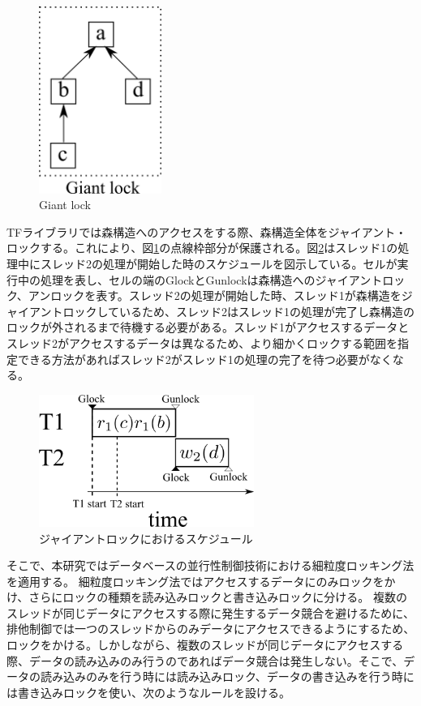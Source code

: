 \documentclass[a4paper]{jreport}	%
\begin{document}
\begin{figure}[h] 
\centering
\includegraphics[width=4cm]{gaint-lock}	
\caption{Giant lock}
\label{fig:giant-lock}
\end{figure}


TFライブラリでは森構造へのアクセスをする際、森構造全体をジャイアント・ロックする。これにより、図\ref{fig:giant-lock}の点線枠部分が保護される。図\ref{fig:g-lock-time}はスレッド1の処理中にスレッド2の処理が開始した時のスケジュールを図示している。セルが実行中の処理を表し、セルの端のGlockとGunlockは森構造へのジャイアントロック、アンロックを表す。スレッド2の処理が開始した時、スレッド1が森構造をジャイアントロックしているため、スレッド2はスレッド1の処理が完了し森構造のロックが外されるまで待機する必要がある。スレッド1がアクセスするデータとスレッド2がアクセスするデータは異なるため、より細かくロックする範囲を指定できる方法があればスレッド2がスレッド1の処理の完了を待つ必要がなくなる。


\begin{figure}[h] 
\centering
\includegraphics[width=7cm]{g-lock-time.png}	
\caption{ジャイアントロックにおけるスケジュール}
\label{fig:g-lock-time}
\end{figure}

そこで、本研究ではデータベースの並行性制御技術における細粒度ロッキング法を適用する。
細粒度ロッキング法ではアクセスするデータにのみロックをかけ、さらにロックの種類を読み込みロックと書き込みロックに分ける。
複数のスレッドが同じデータにアクセスする際に発生するデータ競合を避けるために、排他制御では一つのスレッドからのみデータにアクセスできるようにするため、ロックをかける。しかしながら、複数のスレッドが同じデータにアクセスする際、データの読み込みのみ行うのであればデータ競合は発生しない。そこで、データの読み込みのみを行う時には読み込みロック、データの書き込みを行う時には書き込みロックを使い、次のようなルールを設ける。
\end{document}
